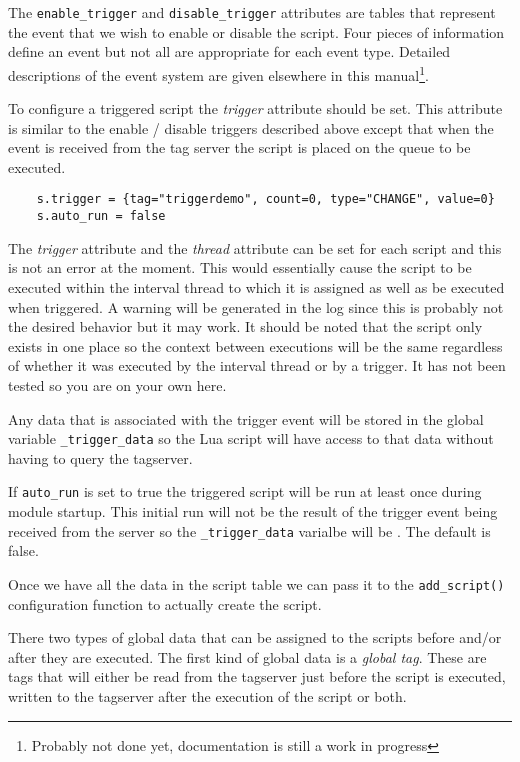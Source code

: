 The \texttt{enable\_trigger} and \texttt{disable\_trigger} attributes are tables that represent the \opendax
event that we wish to enable or disable the script.  Four pieces of information define an event but
not all are appropriate for each event type.  Detailed descriptions of the event system are given
elsewhere in this manual\footnote{Probably not done yet, documentation is still a work in progress}.

To configure a triggered script the \textit{trigger} attribute should be set.  This attribute is
similar to the enable / disable triggers described above except that when the event is received
from the tag server the script is placed on the queue to be executed.

\begin{verbatim}
	s.trigger = {tag="triggerdemo", count=0, type="CHANGE", value=0}
    s.auto_run = false
\end{verbatim}

The \textit{trigger} attribute and the \textit{thread} attribute can be set for each script and this
is not an error at the moment.  This would essentially cause the script to be executed within
the interval thread to which it is assigned as well as be executed when triggered.  A warning will
be generated in the log since this is probably not the desired behavior but it may work.  It should
be noted that the script only exists in one place so the context between executions will be the
same regardless of whether it was executed by the interval thread or by a trigger.  It has not
been tested so you are on your own here.

Any data that is associated with the trigger event will be stored in the global variable
\texttt{\_trigger\_data} so the Lua script will have access to that data without having to query
the tagserver.

If \texttt{auto\_run} is set to true the triggered script will be run at least once during
module startup.  This initial run will not be the result of the trigger event being received
from the server so the \texttt{\_trigger\_data} varialbe will be .  The default
is false.

Once we have all the data in the script table we can pass it to the \texttt{add\_script()} configuration
function to actually create the script.

There two types of global data that can be assigned to the scripts before and/or after they are
executed.  The first kind of global data is a \textit{global tag}.  These are \opendax tags that will
either be read from the tagserver just before the script is executed, written to the tagserver
after the execution of the script or both.

